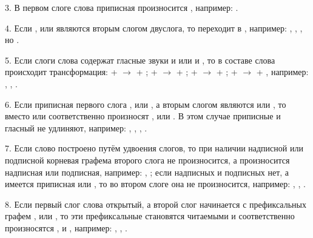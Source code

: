 3. В первом слоге слова приписная  произносится , например: .

4. Если ,  или  являются вторым слогом двуслога, то  переходит в , например: , , , но .

5. Если слоги слова содержат гласные звуки  и  или  и , то в составе слова происходит трансформация:  +  $\rightarrow$  + ;  +  $\rightarrow$  + ;  +  $\rightarrow$  + ;  +  $\rightarrow$  + , например: , , .

6. Если приписная первого слога ,  или , а вторым слогом являются  или , то вместо  или  соответственно произносят ,  или . В этом случае приписные  и  гласный не удлиняют, например:
,
,
,
.

7. Если слово построено путём удвоения слогов, то при наличии надписной или подписной корневая графема второго слога не произносится, а произносится надписная или подписная, например:
, ;
если надписных и подписных нет, а имеется приписная  или , то во втором слоге она не произносится, например:
,
,
.

8. Если первый слог слова открытый, а второй слог начинается с префиксальных графем ,  или , то эти префиксальные становятся читаемыми и соответственно произносятся ,  и , например:
,
,
.

